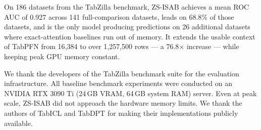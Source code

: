 \documentclass{article}
\begin{document}
On 186 datasets from the TabZilla benchmark, ZS-ISAB achieves a mean ROC AUC of 0.927 across 141 full-comparison datasets, leads on 68.8\% of those datasets, and is the only model producing predictions on 26 additional datasets where exact-attention baselines run out of memory. It extends the usable context of TabPFN from 16{,}384 to over 1{,}257{,}500 rows --- a 76.8$\times$ increase --- while keeping peak GPU memory constant.

We thank the developers of the TabZilla benchmark suite for the evaluation infrastructure. All baseline benchmark experiments were conducted on an NVIDIA RTX 3090 Ti (24\,GB VRAM, 64\,GB system RAM) server. Even at peak scale, ZS-ISAB did not approach the hardware memory limits. We thank the authors of TabICL and TabDPT for making their implementations publicly available.





\end{document}
